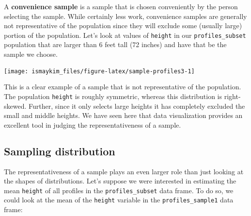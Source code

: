 \documentclass[]{tufte-book}
\newenvironment{Shaded}{\begin{snugshade}}{\end{snugshade}}
\newcommand{\KeywordTok}[1]{\textcolor[rgb]{0.13,0.29,0.53}{\textbf{{#1}}}}
\newcommand{\DataTypeTok}[1]{\textcolor[rgb]{0.13,0.29,0.53}{{#1}}}
\newcommand{\DecValTok}[1]{\textcolor[rgb]{0.00,0.00,0.81}{{#1}}}
\newcommand{\StringTok}[1]{\textcolor[rgb]{0.31,0.60,0.02}{{#1}}}
\newcommand{\NormalTok}[1]{{#1}}
\begin{document}
A \textbf{convenience sample} is a sample that is chosen conveniently by
the person selecting the sample. While certainly less work, convenience
samples are generally not representative of the population since they
will exclude some (usually large) portion of the population. Let's look
at values of \texttt{height} in our \texttt{profiles\_subset} population
that are larger than 6 feet tall (72 inches) and have that be the sample
we choose.

\begin{Shaded}
\end{Shaded}

\begin{center}\texttt{[image: ismaykim\_files/figure-latex/sample-profiles3-1]} \end{center}

This is a clear example of a sample that is not representative of the
population. The population \texttt{height} is roughly symmetric, whereas
this distribution is right-skewed. Further, since it only selects large
heights it has completely excluded the small and middle heights. We have
seen here that data visualization provides an excellent tool in judging
the representativeness of a sample.

\subsection{Sampling distribution}\label{sampling-distribution}

The representativeness of a sample plays an even larger role than just
looking at the shapes of distributions. Let's suppose we were interested
in estimating the mean \texttt{height} of all profiles in the
\texttt{profiles\_subset} data frame. To do so, we could look at the
mean of the \texttt{height} variable in the \texttt{profiles\_sample1}
data frame:
\end{document}
